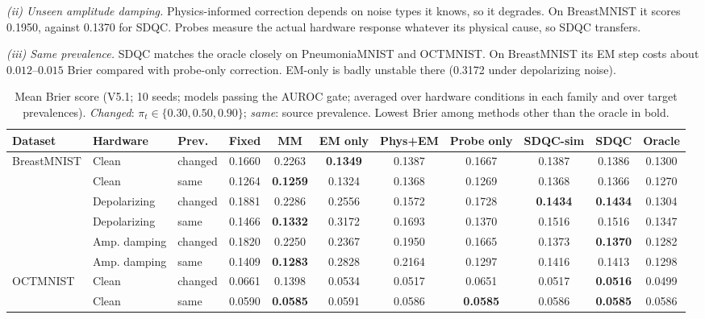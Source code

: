 \documentclass[conference]{IEEEtran}
\begin{document}
\emph{(ii) Unseen amplitude damping.} Physics-informed correction depends on noise types it knows, so it degrades. On BreastMNIST it scores 0.1950, against 0.1370 for SDQC. Probes measure the actual hardware response whatever its physical cause, so SDQC transfers.

\emph{(iii) Same prevalence.} SDQC matches the oracle closely on PneumoniaMNIST and OCTMNIST. On BreastMNIST its EM step costs about $0.012$--$0.015$ Brier compared with probe-only correction. EM-only is badly unstable there (0.3172 under depolarizing noise).

\begin{table}[t]
\centering
\caption{Mean Brier score (V5.1; 10 seeds; models passing the AUROC gate; averaged over hardware conditions in each family and over target prevalences). \emph{Changed}: $\pi_t\in\{0.30,0.50,0.90\}$; \emph{same}: source prevalence. Lowest Brier among methods other than the oracle in bold.}
\label{tab:brier}
\setlength{\tabcolsep}{4.5pt}
\begin{adjustbox}{max width=\linewidth}
\begin{tabular}{lllcccccccc}
\toprule
Dataset & Hardware & Prev. & Fixed & MM & EM only & Phys+EM & Probe only & SDQC-sim & SDQC & Oracle \\
\midrule
\multirow{6}{*}{BreastMNIST}
 & Clean        & changed & 0.1660 & 0.2263 & \textbf{0.1349} & 0.1387 & 0.1667 & 0.1387 & 0.1386 & 0.1300 \\
 & Clean        & same    & 0.1264 & \textbf{0.1259} & 0.1324 & 0.1368 & 0.1269 & 0.1368 & 0.1366 & 0.1270 \\
 & Depolarizing & changed & 0.1881 & 0.2286 & 0.2556 & 0.1572 & 0.1728 & \textbf{0.1434} & \textbf{0.1434} & 0.1304 \\
 & Depolarizing & same    & 0.1466 & \textbf{0.1332} & 0.3172 & 0.1693 & 0.1370 & 0.1516 & 0.1516 & 0.1347 \\
 & Amp. damping & changed & 0.1820 & 0.2250 & 0.2367 & 0.1950 & 0.1665 & 0.1373 & \textbf{0.1370} & 0.1282 \\
 & Amp. damping & same    & 0.1409 & \textbf{0.1283} & 0.2828 & 0.2164 & 0.1297 & 0.1416 & 0.1413 & 0.1298 \\
\midrule
\multirow{6}{*}{OCTMNIST}
 & Clean        & changed & 0.0661 & 0.1398 & 0.0534 & 0.0517 & 0.0651 & 0.0517 & \textbf{0.0516} & 0.0499 \\
 & Clean        & same    & 0.0590 & \textbf{0.0585} & 0.0591 & 0.0586 & \textbf{0.0585} & 0.0586 & \textbf{0.0585} & 0.0586 \\

\end{tabular}
\end{adjustbox}
\end{table}
\end{document}
